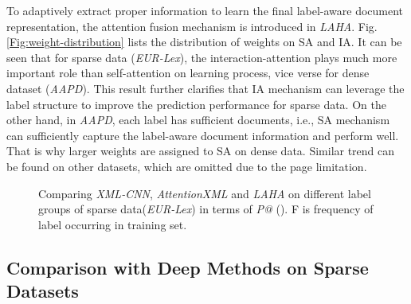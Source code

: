 \documentclass[runningheads]{llncs}
\begin{document}
To adaptively extract proper information to learn the final label-aware document representation, the attention fusion mechanism is introduced in \textit{LAHA}. Fig.\ref{Fig:weight-distribution} lists the distribution of weights on SA and IA. It can be seen that for sparse data (\textit{EUR-Lex}), the interaction-attention plays much more important role than self-attention on learning process, vice verse for dense dataset (\textit{AAPD}). This result further clarifies that IA mechanism can leverage the label structure to improve the prediction performance for sparse data. On the other hand, in \textit{AAPD}, each label has sufficient documents, i.e., SA mechanism can sufficiently capture the label-aware document information and perform well. That is why larger weights are assigned to SA on dense data. 
Similar trend can be found on other datasets, which are omitted due to the page limitation.


\begin{figure}[h]\centering
	\setlength{\abovecaptionskip}{0.cm}
	\setlength{\belowcaptionskip}{-0.cm}	
	\caption{Comparing 
		\textit{XML-CNN}, \textit{AttentionXML} and \textit{LAHA} on different label groups of sparse data(\textit{EUR-Lex}) in terms of \textit{P@} (). F is frequency of label occurring in training set.} \label{Fig:group-result1}
\end{figure}

\subsection{Comparison with Deep Methods on Sparse Datasets}
\end{document}
